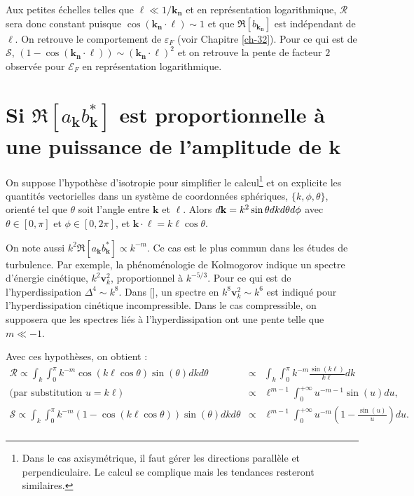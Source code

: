  Aux petites échelles telles que $\boldsymbol{\ell} \ll 1/\boldsymbol{k_n}$ et en représentation logarithmique, $\mathcal{R}$ sera donc constant puisque $ \cos\left(\boldsymbol{k_n}\cdot\boldsymbol{\ell}\right)\sim 1 $ et que $ \Re[b_{\boldsymbol{k_n}}]$ est indépendant de $\boldsymbol{\ell}$. On retrouve le comportement de $\varepsilon_{F}$ (voir Chapitre \ref{ch-32}). Pour ce qui est de $\mathcal{S}$, $ \left(1-\cos\left(\boldsymbol{k_n}\cdot\boldsymbol{\ell}\right)\right) \sim \left(\boldsymbol{k_n}\cdot\boldsymbol{\ell}\right)^2$ et on retrouve la pente de facteur $2$  observée pour $\mathcal{E}_{F}$ en représentation logarithmique. 
 
 \section{Si \ensuremath{\Re[a_{\boldsymbol{k}}  b^*_{\boldsymbol{k}}]} est proportionnelle à une puissance de l'amplitude de \ensuremath{\boldsymbol{k}} } \label{an:sat}
 
 On suppose l'hypothèse d'isotropie pour simplifier le calcul\footnote{Dans le cas axisymétrique, il faut gérer les directions parallèle et perpendiculaire. Le calcul se complique mais les tendances resteront similaires.} et on explicite les quantités vectorielles dans un système de coordonnées sphériques,  $\{k,\phi,\theta\}$, orienté tel que $\theta$ soit l'angle entre $\boldsymbol{k}$ et $\boldsymbol{\ell}$. Alors $d{\bf k} = k^2 \sin \theta dk d\theta d\phi$ avec $\theta \in [0,\pi]$ et $\phi \in [0,2\pi]$, et $\boldsymbol{k}\cdot\boldsymbol{\ell} = k\ell \cos\theta$. 
 
 On note aussi $k^{2} \Re[a_{\boldsymbol{k}}  b^*_{\boldsymbol{k}}] \propto k^{-m}$. Ce cas est le plus commun dans les études de turbulence. Par exemple, la phénoménologie de Kolmogorov indique un spectre d'énergie cinétique,  $k^2 \boldsymbol{v}^2_k$, proportionnel à $k^{-5/3}$. Pour ce qui est de l'hyperdissipation $\Delta^4 \sim k^8$. Dans [\cite{ferrand_multi-scale_2021}], un spectre en $k^8 \boldsymbol{v}^2_k \sim k^6$  est indiqué pour l'hyperdissipation cinétique incompressible. Dans le cas compressible, on supposera que les spectres liés à l'hyperdissipation ont une pente telle que $m \ll -1$.

 Avec ces hypothèses, on obtient :
 \begin{eqnarray}
 \mathcal{R} \propto \int_k \int^{\pi}_0 k^{-m} \cos\left(k\ell \cos\theta\right) \sin\left(\theta\right)dk d\theta &\propto& \int_k \int^{\pi}_0 k^{-m} \frac{\sin\left(k\ell\right)}{k\ell} dk \nonumber\\
 \textrm{(par substitution $u = k\ell$) } &\propto& \ell^{m-1} \int_0^{+\infty} u^{-m-1} \sin\left(u\right) du ,\quad \\
\mathcal{S} \propto \int_k \int^{\pi}_0 k^{-m}  \left(1-\cos\left(k\ell \cos\theta\right)\right) \sin\left(\theta\right)dk d\theta &\propto& \ell^{m-1} \int_0^{+\infty} u^{-m} \left(1-\frac{\sin\left(u\right)}{u}\right) du .\nonumber \\
 \end{eqnarray}
 
